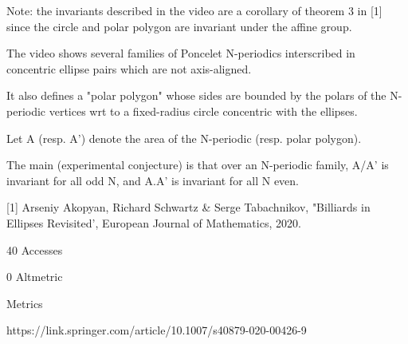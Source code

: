 Note: the invariants described in the video are a corollary of theorem 3 in [1] since the circle and polar polygon are invariant under the affine group.

The video shows several families of Poncelet N-periodics interscribed in concentric ellipse pairs which are not axis-aligned.

It also defines a "polar polygon" whose sides are bounded by the polars of the N-periodic vertices wrt to a fixed-radius circle concentric with the ellipses.

Let A  (resp. A') denote the area of the N-periodic (resp. polar polygon).

The main (experimental conjecture) is that over an N-periodic family, A/A' is invariant for all odd N, and A.A' is invariant for all N even.

[1] Arseniy Akopyan, Richard Schwartz & Serge Tabachnikov, "Billiards in Ellipses Revisited', European Journal of Mathematics, 2020. 

40 Accesses

0 Altmetric

Metrics

https://link.springer.com/article/10.1007/s40879-020-00426-9